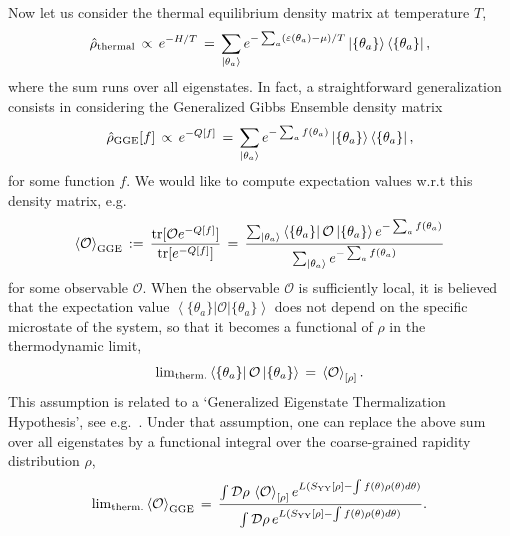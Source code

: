 \documentclass[onecolumn,amsfonts,showpacs,superscriptaddress]{revtex4-1}
\begin{document}
Now let us consider the thermal equilibrium density matrix at temperature $T$,
\begin{equation}
    \label{eq:thermalrho}
    \hat{\rho}_{\rm thermal} \, \propto \, e^{-  H/T} \, = \, \sum_{\left| \theta_a \right> } e^{-  \sum_{a} (\varepsilon(\theta_a) -\mu)/T } \left|  \{ \theta_a \} \right> \left<  \{ \theta_a \} \right|  ,
\end{equation}
where the sum runs over all eigenstates. In fact, a straightforward generalization consists in considering the  Generalized Gibbs Ensemble \citep{rigol2007relaxation,rigol2008thermalization} density matrix
\begin{equation}
    \label{eq:GGErho}
    \hat{\rho}_{\rm GGE}[f] \, \propto \, e^{- Q[f]} \, = \, \sum_{\left| \theta_a \right> } e^{- \sum_{a} f(\theta_a) } \left|  \{ \theta_a \} \right> \left<  \{ \theta_a \} \right| ,
\end{equation}
for some function $f$. We would like to compute expectation values w.r.t this density matrix, e.g.
\begin{equation}
    \left< \mathcal{O} \right>_{\rm GGE} \, := \, \frac{{\rm tr} [\mathcal{O} e^{-Q[f]} ]}{ {\rm tr}[e^{-Q[f]}] } \, = \, \frac{    \sum_{\left| \theta_a \right> } \left<  \{ \theta_a \} \right| \mathcal{O} \left|  \{ \theta_a \} \right> e^{- \sum_{a} f(\theta_a) }  }{ \sum_{\left| \theta_a \right> } e^{- \sum_{a} f(\theta_a) }  }
\end{equation}
for some observable $\mathcal{O}$. When the observable $\mathcal{O}$ is sufficiently local, it is believed that the expectation value $\left<  \{ \theta_a \} \right| \mathcal{O} \left|  \{ \theta_a \} \right>$ does not depend on the specific microstate of the system, so that it becomes a functional of $\rho$ in the thermodynamic limit,
\begin{equation}
\label{eq:generalized-ETH}
    {\rm lim}_{\rm therm.} \left<  \{ \theta_a \} \right| \mathcal{O} \left|  \{ \theta_a \} \right> \, = \, \left< \mathcal{O}\right>_{[\rho]} .
\end{equation}
This assumption is related to a `Generalized Eigenstate Thermalization Hypothesis', see e.g.~\citep{cassidy2011generalized,pozsgay2011mean,he2013single,pozsgay2014failure,vidmar2016generalized,dymarsky2019generalized}. Under that assumption, one can replace the above sum over all eigenstates by a functional integral over the coarse-grained rapidity distribution $\rho$,
\begin{equation}
    \label{eq:thermO_GGE}
    {\rm lim}_{\rm therm.}  \left< \mathcal{O} \right>_{\rm GGE} \, = \, \frac{  \int \mathcal{D} \rho \, \left< \mathcal{O} \right>_{[\rho]}  e^{L ( S_{\rm YY}[\rho] - \int f(\theta) \rho(\theta) d\theta ) }  }{  \int \mathcal{D} \rho \, e^{L ( S_{\rm YY}[\rho] - \int f(\theta) \rho(\theta) d\theta ) }  } .
\end{equation}
\end{document}

